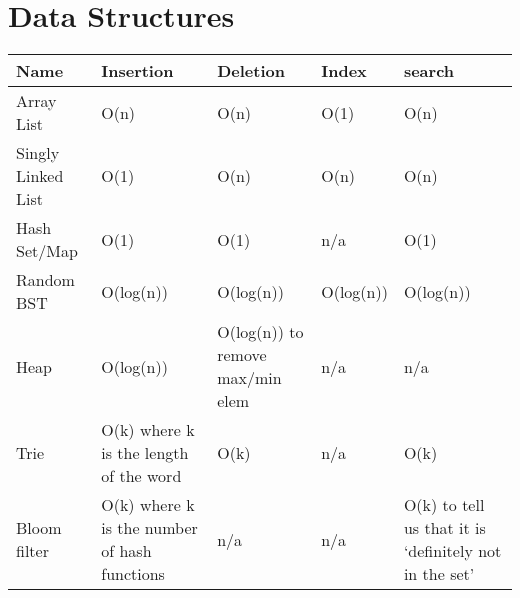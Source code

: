 \section{Data Structures}
\begin{center}
\begin{longtable}{|l|p{3cm}|l|l|p{3cm}|}
\hline
\textbf{Name} & \textbf{Insertion} & \textbf{Deletion} & \textbf{Index} & \textbf{search} \\
\hline 

Array List & O(n) & O(n) & O(1) & O(n) \\

\hline

Singly Linked List & O(1) & O(n) & O(n) & O(n) \\

\hline

Hash Set/Map & O(1) & O(1) & n/a & O(1) \\

\hline 

Random BST & O(log(n)) & O(log(n)) & O(log(n)) & O(log(n)) \\

\hline 

Heap & O(log(n)) & O(log(n)) to remove max/min elem & n/a & n/a \\

\hline 

Trie & O(k) where k is the length of the word & O(k) & n/a &  O(k) \\

\hline

Bloom filter & O(k) where k is the number of hash functions & n/a & n/a & O(k) to tell us that it is `definitely not in the set'\\

\hline

\end{longtable}
\end{center}